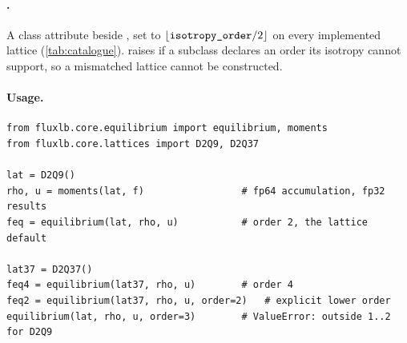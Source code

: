 \paragraph{.}
A class attribute beside , set to
$\lfloor\texttt{isotropy\_order}/2\rfloor$ on every implemented lattice
(\cref{tab:catalogue}).  raises  if a subclass
declares an order its isotropy cannot support, so a mismatched lattice cannot be
constructed.

\paragraph{Usage.}
\begin{lstlisting}[style=py]
from fluxlb.core.equilibrium import equilibrium, moments
from fluxlb.core.lattices import D2Q9, D2Q37

lat = D2Q9()
rho, u = moments(lat, f)                 # fp64 accumulation, fp32 results
feq = equilibrium(lat, rho, u)           # order 2, the lattice default

lat37 = D2Q37()
feq4 = equilibrium(lat37, rho, u)        # order 4
feq2 = equilibrium(lat37, rho, u, order=2)   # explicit lower order
equilibrium(lat, rho, u, order=3)        # ValueError: outside 1..2 for D2Q9
\end{lstlisting}
